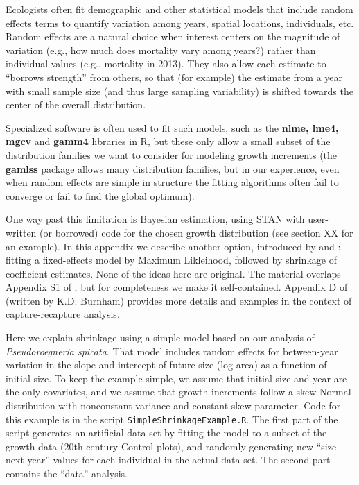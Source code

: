 \documentclass[11pt]{article}
\begin{document}
{Ecologists often fit demographic and other statistical models that include random effects terms to
quantify variation among years, spatial locations, individuals, etc. Random effects
are a natural choice when interest centers on the magnitude of variation (e.g., how much does mortality vary among years?)  
rather than individual values (e.g., mortality in 2013). They also allow each estimate to 
``borrows strength'' from others, so that (for example) the estimate from a year with small sample size (and thus large 
sampling variability) is shifted towards the center of the overall distribution. 

Specialized software is often used to fit such models, such as the \textbf{nlme, lme4, mgcv} and \textbf{gamm4} libraries in R,  
but these only allow a small subset of the distribution families we want to consider for modeling growth increments (the \textbf{gamlss} 
package allows many distribution families, but in our experience, even when random effects are simple in structure 
the fitting algorithms often fail to converge or fail to find the global optimum). 

One way past this limitation is Bayesian estimation, using STAN with user-written (or borrowed) 
code for the chosen growth distribution (see section XX for an example). 
In this appendix we describe another option, introduced by \citet{link-nichols-1994} and \citet{gould-nichols-1998}: 
fitting a fixed-effects model by Maximum Likleihood, followed by shrinkage of coefficient estimates. 
None of the ideas here are original. The material overlaps Appendix S1 of \citet{metcalf-etal-2015}, 
but for completeness we make it self-contained. Appendix D of \citet{cooch-white-2020} (written by K.D. Burnham)
provides more details and examples in the context of capture-recapture analysis. 

Here we explain shrinkage using a simple model based on our analysis of \emph{Pseudoroegneria spicata}. 
That model includes random effects for between-year variation in the slope and intercept of future size 
(log area) as a function of initial size. To keep the example simple, we assume that initial size 
and year are the only covariates, and we assume that growth increments 
follow a skew-Normal distribution with nonconstant variance and constant skew parameter. 
Code for this example is in the script \texttt{SimpleShrinkageExample.R}. The first part of the script generates
an artificial data set by fitting the model to a subset of the growth data (20th century Control plots), and
randomly generating new ``size next year'' values for each individual in the actual data set. 
The second part contains the ``data'' analysis. 

}
\end{document}
